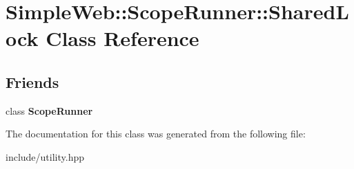 \hypertarget{classSimpleWeb_1_1ScopeRunner_1_1SharedLock}{}\section{Simple\+Web\+:\+:Scope\+Runner\+:\+:Shared\+Lock Class Reference}
\label{classSimpleWeb_1_1ScopeRunner_1_1SharedLock}
\subsection*{Friends}
\begin{DoxyCompactItemize}
\item 
class {\bfseries Scope\+Runner}\hypertarget{classSimpleWeb_1_1ScopeRunner_1_1SharedLock_a4612a8222549c69a618524d3f0fda04b}{}\label{classSimpleWeb_1_1ScopeRunner_1_1SharedLock_a4612a8222549c69a618524d3f0fda04b}

\end{DoxyCompactItemize}


The documentation for this class was generated from the following file\+:\begin{DoxyCompactItemize}
\item 
include/utility.\+hpp\end{DoxyCompactItemize}
